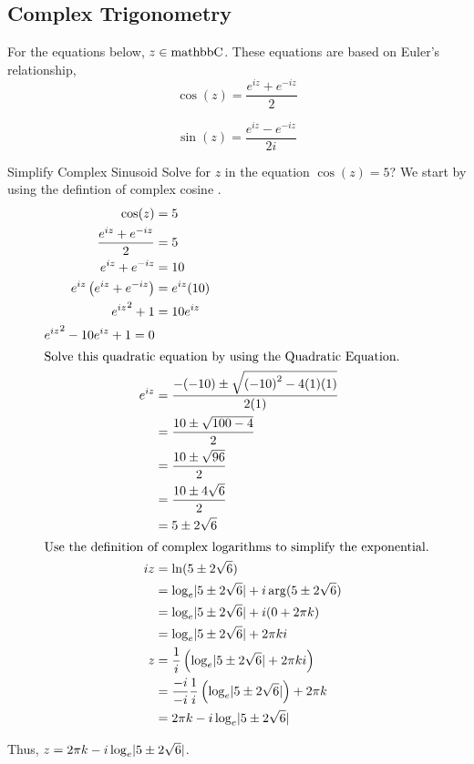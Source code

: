 \subsection{Complex Trigonometry}\label{subsec:Complex_Trigonometry}
For the equations below, $z \in \operatorname{mathbb{C}}$.
These equations are based on Euler's relationship, 
\begin{equation}\label{eq:Complex_Cosine}
  \cos(z) = \frac{e^{iz} + e^{-iz}}{2}
\end{equation}

\begin{equation}\label{eq:Complex_Sine}
  \sin(z) = \frac{e^{iz} - e^{-iz}}{2i}
\end{equation}

\begin{example}[Lecture 3]{Simplify Complex Sinusoid}
  Solve for $z$ in the equation $\cos(z) = 5$?
  \tcblower{}
  We start by using the defintion of complex cosine .
  \begin{align*}
    \cos(z) &= 5 \\
    \frac{e^{iz} + e^{-iz}}{2} &= 5 \\
    e^{iz} + e^{-iz} &= 10 \\
    e^{iz} \left( e^{iz} + e^{-iz} \right) &= e^{iz} (10) \\
    {e^{iz}}^{2} + 1 &= 10e^{iz} \\
    {e^{iz}}^{2} -10e^{iz} + 1 = 0 \\
    \shortintertext{Solve this quadratic equation by using the Quadratic Equation.}
    e^{iz} &= \frac{-(-10) \pm \sqrt{{(-10)}^{2} - 4(1)(1)}}{2(1)} \\
            &= \frac{10 \pm \sqrt{100 - 4}}{2} \\
            &= \frac{10 \pm \sqrt{96}}{2} \\
            &= \frac{10 \pm 4 \sqrt{6}}{2} \\
            &= 5 \pm 2 \sqrt{6} \\
    \intertext{Use the definition of complex logarithms to simplify the exponential.}
    iz &= \ln(5 \pm 2 \sqrt{6}) \\
            &= \log_{e} \lvert 5 \pm 2 \sqrt {6} \rvert + i \arg(5 \pm 2 \sqrt{6}) \\
            &= \log_{e} \lvert 5 \pm 2 \sqrt {6} \rvert + i (0 + 2\pi k) \\
            &= \log_{e} \lvert 5 \pm 2 \sqrt {6} \rvert + 2\pi k i \\
    z &= \frac{1}{i} \left( \log_{e} \lvert 5 \pm 2 \sqrt {6} \rvert + 2\pi k i \right) \\
            &= \frac{-i}{-i} \frac{1}{i} \left( \log_{e} \lvert 5 \pm 2 \sqrt {6} \rvert \right) + 2\pi k \\
    &= 2\pi k - i\log_{e} \lvert 5 \pm 2 \sqrt{6} \rvert
  \end{align*}

  Thus, $z = 2\pi k - i\log_{e} \lvert 5 \pm 2 \sqrt{6} \rvert$.
\end{example}

